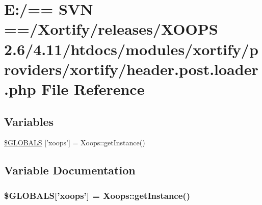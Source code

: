 \hypertarget{xortify_2header_8post_8loader_8php}{\section{E\-:/== S\-V\-N ==/\-Xortify/releases/\-X\-O\-O\-P\-S 2.6/4.11/htdocs/modules/xortify/providers/xortify/header.post.\-loader.\-php File Reference}
\label{xortify_2header_8post_8loader_8php}
}
\subsection*{Variables}
\begin{DoxyCompactItemize}
\item 
\hyperlink{xortify_2header_8post_8loader_8php_ad10934112c0d18cf6b358d47afa6fcf1}{\$\-G\-L\-O\-B\-A\-L\-S} \mbox{[}'xoops'\mbox{]} = Xoops\-::get\-Instance()
\end{DoxyCompactItemize}


\subsection{Variable Documentation}
\hypertarget{xortify_2header_8post_8loader_8php_ad10934112c0d18cf6b358d47afa6fcf1}{
\subsubsection[{\$\-G\-L\-O\-B\-A\-L\-S}]{\setlength{\rightskip}{0pt plus 5cm}\$G\-L\-O\-B\-A\-L\-S\mbox{[}'xoops'\mbox{]} = Xoops\-::get\-Instance()}}\label{xortify_2header_8post_8loader_8php_ad10934112c0d18cf6b358d47afa6fcf1}
